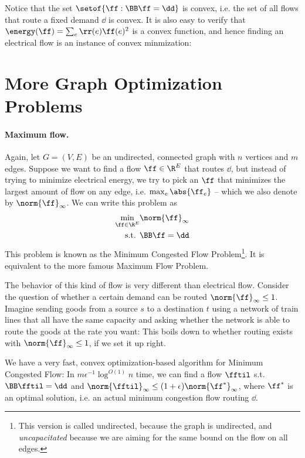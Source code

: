 Notice that the set $\setof{ \ff: \BB \ff = \dd}$ is convex, i.e. the
set of all flows that route a fixed demand $\dd$ is convex.
It is also easy to verify that $\energy(\ff) = \sum_e \rr(e) \ff(e)^2$
is a convex function, and hence finding an electrical flow is an
instance of convex minmization:



\section{More Graph Optimization Problems}

\paragraph{Maximum flow.}
Again, let $G=(V,E)$ be an undirected, connected graph with $n$
vertices and $m$ edges.
Suppose we want to find a flow
$\ff \in \R^E$ that routes $\dd$, but instead of trying to minimize
electrical energy, we try to pick an $\ff$ that minimizes the largest
amount of flow on any edge, i.e. $\max_e \abs{\ff_e}$  -- which we
also denote by $\norm{\ff}_{\infty}$.
We can write this problem as
\begin{align*}
\min_{\ff \in \R^E } & \norm{\ff}_{\infty} \\
\textrm{s.t. } & \BB \ff = \dd
\end{align*}
This problem is known as the Minimum Congested Flow Problem\footnote{This
  version is called undirected, because the graph is undirected, and
  \emph{uncapacitated} because we are aiming for the same
  bound on the flow on all edges.}.
It is equivalent to the more famous Maximum Flow Problem.

The behavior of this kind of flow is very different than electrical
flow. Consider the question of whether a certain demand can be routed
$\norm{\ff}_{\infty} \leq 1$.
Imagine sending goods from a source $s$ to a destination $t$ using a
network of train lines that all have the
same capacity and asking whether the network is able to route the
goods at the rate you want: This boils down to whether routing exists
with $\norm{\ff}_{\infty} \leq 1$, if we set it up right.

We have a very fast, convex optimization-based algorithm for Minimum Congested Flow:
In $m \epsilon^{-1} \log^{O(1)} n$ time, we can find a flow $\fftil$
s.t. $\BB \fftil = \dd$ and $\norm{\fftil}_{\infty} \leq
(1+\epsilon)\norm{\ff^*}_{\infty}$, where $\ff^*$ is an optimal solution, i.e. an
actual minimum congestion flow routing $\dd$.

